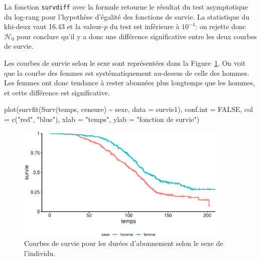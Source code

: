 \documentclass[
  11pt,
  letterpaper,
]{scrbook}
\newenvironment{Shaded}{\begin{snugshade}}{\end{snugshade}}
\newcommand{\AttributeTok}[1]{\textcolor[rgb]{0.40,0.45,0.13}{#1}}
\newcommand{\ConstantTok}[1]{\textcolor[rgb]{0.56,0.35,0.01}{#1}}
\newcommand{\FunctionTok}[1]{\textcolor[rgb]{0.28,0.35,0.67}{#1}}
\newcommand{\NormalTok}[1]{\textcolor[rgb]{0.00,0.23,0.31}{#1}}
\newcommand{\SpecialCharTok}[1]{\textcolor[rgb]{0.37,0.37,0.37}{#1}}
\newcommand{\StringTok}[1]{\textcolor[rgb]{0.13,0.47,0.30}{#1}}
\theoremstyle{definition}
\theoremstyle{remark}
\begin{document}
La fonction \texttt{survdiff} avec la formule retourne le résultat du
test asymptotique du log-rang pour l'hypothèse d'égalité des fonctions
de survie. La statistique du khi-deux vaut 16.43 et la valeur-\(p\) du
test est inférieure à \(10^{-4}\): on rejette donc \(\mathscr{H}_0\)
pour conclure qu'il y a donc une différence significative entre les deux
courbes de survie.

Les courbes de survie selon le sexe sont représentées dans la
Figure~\ref{fig-survie-comparaison-courbes}. On voit que la courbe des
femmes est systématiquement au-dessus de celle des hommes. Les femmes
ont donc tendance à rester abonnées plus longtemps que les hommes, et
cette différence est significative.

\begin{Shaded}
\begin{Highlighting}[]
\FunctionTok{plot}\NormalTok{(}\FunctionTok{survfit}\NormalTok{(}\FunctionTok{Surv}\NormalTok{(temps, censure) }\SpecialCharTok{\textasciitilde{}}\NormalTok{ sexe, }
             \AttributeTok{data =}\NormalTok{ survie1), }
     \AttributeTok{conf.int =} \ConstantTok{FALSE}\NormalTok{,}
     \AttributeTok{col =} \FunctionTok{c}\NormalTok{(}\StringTok{"red"}\NormalTok{, }\StringTok{"blue"}\NormalTok{), }
     \AttributeTok{xlab =} \StringTok{"temps"}\NormalTok{, }
     \AttributeTok{ylab =} \StringTok{"fonction de survie"}\NormalTok{)}
\end{Highlighting}
\end{Shaded}

\begin{figure}[ht!]

{\centering \includegraphics[width=0.9\textwidth,height=\textheight]{./06-survie_files/figure-pdf/fig-survie-comparaison-courbes-1.pdf}

}

\caption{\label{fig-survie-comparaison-courbes}Courbes de survie pour
les durées d'abonnement selon le sexe de l'individu.}

\end{figure}
\end{document}
